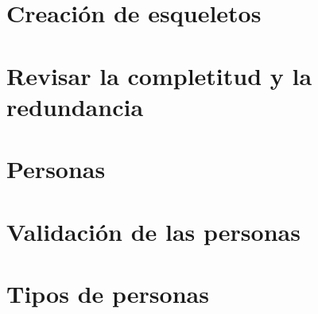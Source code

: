 \section{Creación de esqueletos}
\section{Revisar la completitud y la redundancia}
\section{Personas}
\section{Validación de las personas}
\section{Tipos de personas}